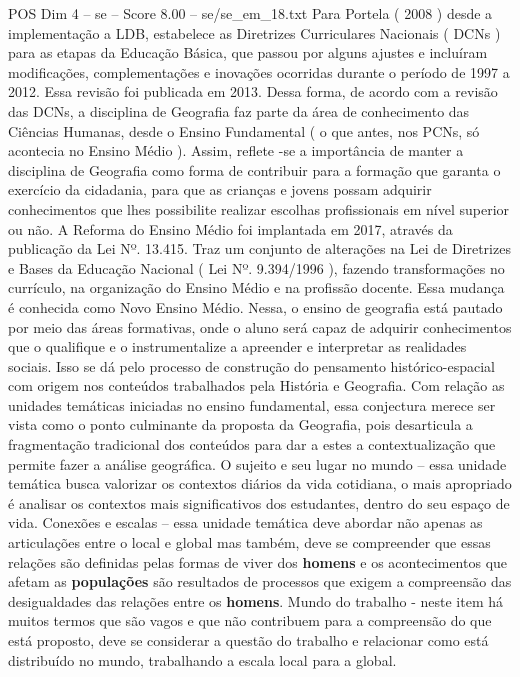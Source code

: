 \begin{textsample}{POS Dim 4 – se – Score 8.00 – se/se\_em\_18.txt}
Para Portela ( 2008 ) desde a implementação a LDB, estabelece as Diretrizes Curriculares Nacionais ( DCNs ) para as etapas da Educação Básica, que passou por alguns ajustes e incluíram modificações, complementações e inovações ocorridas durante o período de 1997 a 2012.
Essa revisão foi publicada em 2013.
Dessa forma, de acordo com a revisão das DCNs, a disciplina de Geografia faz parte da área de conhecimento das Ciências Humanas, desde o Ensino Fundamental ( o que antes, nos PCNs, só acontecia no Ensino Médio ).
Assim, reflete -se a importância de manter a disciplina de Geografia como forma de contribuir para a formação que garanta o exercício da cidadania, para que as crianças e jovens possam adquirir conhecimentos que lhes possibilite realizar escolhas profissionais em nível superior ou não.
A Reforma do Ensino Médio foi implantada em 2017, através da publicação da Lei Nº. 13.415.
Traz um conjunto de alterações na Lei de Diretrizes e Bases da Educação Nacional ( Lei Nº. 9.394/1996 ), fazendo transformações no currículo, na organização do Ensino Médio e na profissão docente.
Essa mudança é conhecida como Novo Ensino Médio.
Nessa, o ensino de geografia está pautado por meio das áreas formativas, onde o aluno será capaz de adquirir conhecimentos que o qualifique e o instrumentalize a apreender e interpretar as realidades sociais.
Isso se dá pelo processo de construção do pensamento histórico-espacial com origem nos conteúdos trabalhados pela História e Geografia.
Com relação as unidades temáticas iniciadas no ensino fundamental, essa conjectura merece ser vista como o ponto culminante da proposta da Geografia, pois desarticula a fragmentação tradicional dos conteúdos para dar a estes a contextualização que permite fazer a análise geográfica.
O sujeito e seu lugar no mundo – essa unidade temática busca valorizar os contextos diários da vida cotidiana, o mais apropriado é analisar os contextos mais significativos dos estudantes, dentro do seu espaço de vida.
Conexões e escalas – essa unidade temática deve abordar não apenas as articulações entre o local e global mas também, deve se compreender que essas relações são definidas pelas formas de viver dos \textbf{homens} e os acontecimentos que afetam as \textbf{populações} são resultados de processos que exigem a compreensão das desigualdades das relações entre os \textbf{homens}.
Mundo do trabalho - neste item há muitos termos que são vagos e que não contribuem para a compreensão do que está proposto, deve se considerar a questão do trabalho e relacionar como está distribuído no mundo, trabalhando a escala local para a global.

\end{textsample}
